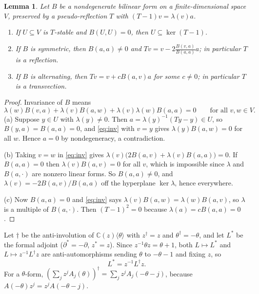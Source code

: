 \documentclass[11pt]{amsart}
\newtheorem{lemma}[thm]{Lemma}
\theoremstyle{definition}
\newcommand{\C}{\mathbb C}
\begin{document}
\begin{lemma}\label{lem:pseudo}
Let $B$ be a nondegenerate bilinear form on a finite-dimensional space $V$, preserved by a pseudo-reflection $T$ with $(T-1)v=\lambda(v)a$.
\begin{enumerate}[label=\textup{(\alph*)}]
\item If $U\subseteq V$ is $T$-stable and $B(U,U)=0$, then $U\subseteq\ker(T-1)$.
\item If $B$ is symmetric, then $B(a,a)\ne0$ and $Tv=v-2\frac{B(v,a)}{B(a,a)}a$; in particular $T$ is a reflection.
\item If $B$ is alternating, then $Tv=v+cB(a,v)a$ for some $c\ne0$; in particular $T$ is a transvection.
\end{enumerate}
\end{lemma}

\begin{proof}
Invariance of $B$ means
\begin{equation}\label{eq:inv}
\lambda(w)B(v,a)+\lambda(v)B(a,w)+\lambda(v)\lambda(w)B(a,a)=0\qquad\text{for all }v,w\in V.
\end{equation}
(a) Suppose $y\in U$ with $\lambda(y)\ne0$. Then $a=\lambda(y)^{-1}(Ty-y)\in U$, so $B(y,a)=B(a,a)=0$, and \eqref{eq:inv} with $v=y$ gives $\lambda(y)B(a,w)=0$ for all $w$. Hence $a=0$ by nondegeneracy, a contradiction.

(b) Taking $v=w$ in \eqref{eq:inv} gives $\lambda(v)\bigl(2B(a,v)+\lambda(v)B(a,a)\bigr)=0$. If $B(a,a)=0$ then $\lambda(v)B(a,v)=0$ for all $v$, which is impossible since $\lambda$ and $B(a,\cdot)$ are nonzero linear forms. So $B(a,a)\ne0$, and $\lambda(v)=-2B(a,v)/B(a,a)$ off the hyperplane $\ker\lambda$, hence everywhere.

(c) Now $B(a,a)=0$ and \eqref{eq:inv} says $\lambda(v)B(a,w)=\lambda(w)B(a,v)$, so $\lambda$ is a multiple of $B(a,\cdot)$. Then $(T-1)^2=0$ because $\lambda(a)=cB(a,a)=0$.
\end{proof}

Let $\dagger$ be the anti-involution of $\C(z)\langle\theta\rangle$ with $z^\dagger=z$ and $\theta^\dagger=-\theta$, and let $L^*$ be the formal adjoint ($\partial^*=-\partial$, $z^*=z$). Since $z^{-1}\theta z=\theta+1$, both $L\mapsto L^*$ and $L\mapsto z^{-1}L^\dagger z$ are anti-automorphisms sending $\theta$ to $-\theta-1$ and fixing $z$, so
\begin{equation}\label{eq:adj}
L^*=z^{-1}L^\dagger z .
\end{equation}
For a $\theta$-form, $(\sum_jz^jA_j(\theta))^\dagger=\sum_jz^jA_j(-\theta-j)$, because $A(-\theta)z^j=z^jA(-\theta-j)$.
\end{document}

